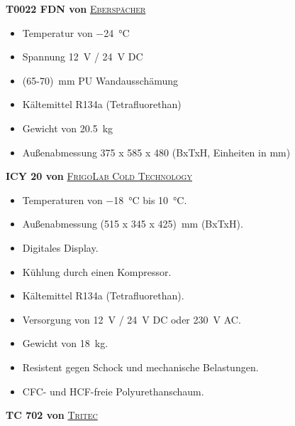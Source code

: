 	\textbf{T0022 FDN von} \href{https://www.eberspaecher-klima.de/fileadmin/data/corporatesite/pdf/de/4_air_conditioning/gp/fh_gp_kuehlcontainer_de.pdf}{\textsc{Eberspächer}}

	\begin{itemize}
		\item Temperatur von \SI{-24}{\celsius}
		\item Spannung \SI{12}{\volt} / \SI{24}{\volt} DC
		\item \SI{(65-70)}{\milli\metre} PU Wandausschämung
		\item Kältemittel R134a (Tetrafluorethan)
		\item Gewicht von \SI{20,5}{\kilo\gram}
		\item Außenabmessung 375 x 585 x 480 (BxTxH, Einheiten in mm)
	\end{itemize}

	\textbf{ICY 20 von} \href{https://www.frigolab.eu/gb/dometic-portable-freezers/67-icy-20.html#/47-normal_or_heated_refrigerator-heated_18c40c}{\textsc{FrigoLab Cold Technology}}

	\begin{itemize}
		\item Temperaturen von \SI{-18}{\celsius} bis \SI{10}{\celsius}.
		\item Außenabmessung \SI{(515 x 345 x 425)}{mm} (BxTxH).
		\item Digitales Display.
		\item Kühlung durch einen Kompressor.
		\item Kältemittel R134a (Tetrafluorethan).
		\item Versorgung von \SI{12}{\volt} / \SI{24}{\volt} DC oder \SI{230}{\volt} AC.
		\item Gewicht von \SI{18}{\kilo\gram}.
		\item Resistent gegen Schock und mechanische Belastungen.
		\item CFC- und HCF-freie Polyurethanschaum.
	\end{itemize}

	\textbf{TC 702 von} \href{https://www.tritec-klima.de/datenblaetter/de/kaelte/portable/TD-TC702.pdf}{\textsc{Tritec}}


